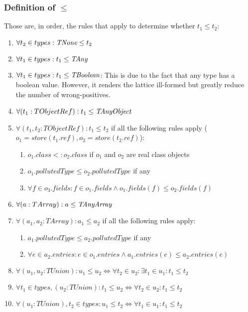 \documentclass[a4paper]{article}
\begin{document}
\subsubsection{Definition of $\leq$}
Those are, in order, the rules that apply to determine whether $t_1 \leq t_2$:
\begin{enumerate}
  \item $\forall t_2 \in types : \emph{TNone} \leq t_2$
  \item $\forall t_1 \in types : t_1 \leq \emph{TAny}$
  \item $\forall t_1 \in types : t_1 \leq \emph{TBoolean}$: This is due to the fact
    that any type has a boolean value. However, it renders the lattice
    ill-formed but greatly reduce the number of wrong-positives.
  \item $\forall (t_1:  TObjectRef): t_1 \leq \emph{TAnyObject}$
  \item $\forall (t_1,t_2: TObjectRef): t_1 \leq t_2$
    if all the following rules apply ($o_1 = store(t_1.ref), o_2 = store(t_2.ref)$):
    \begin{enumerate}
        \item $o_1.class <: o_2.class$ if $o_1$ and $o_2$ are real class objects
        \item $o_1.pollutedType \leq o_2.pollutedType$ if any
        \item $\forall f \in o_3.fields: f \in o_1.fields \wedge o_1.fields(f)
          \leq o_2.fields(f)$
    \end{enumerate}
  \item $\forall (a: TArray) : a \leq \emph{TAnyArray}$
  \item $\forall (a_1,a_2: TArray) : a_1 \leq a_2$
    if all the following rules apply:
    \begin{enumerate}
        \item $a_1.pollutedType \leq a_2.pollutedType$ if any
        \item $\forall e \in a_2.entries: e \in o_1.entries \wedge a_1.entries(e)
          \leq a_2.entries(e)$
    \end{enumerate}
  \item $\forall (u_1,u_2: TUnion) : u_1 \leq u_2 \Leftrightarrow \forall t_2 \in u_2: \exists t_1 \in u_1: t_1 \leq t_2$
  \item $\forall t_1 \in types, (u_2: TUnion) : t_1 \leq u_2 \Leftrightarrow \forall t_2 \in u_2: t_1 \leq t_2$
  \item $\forall (u_1: TUnion), t_2 \in types : u_1 \leq t_2 \Leftrightarrow \forall t_1 \in u_1: t_1 \leq t_2$
\end{enumerate}
\end{document}

